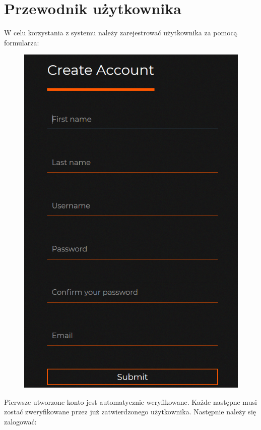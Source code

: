\documentclass[12pt] {article}
\begin{document}
\newpage
\section{Przewodnik użytkownika}
W celu korzystania z systemu należy zarejestrować użytkownika za pomocą formularza:
\begin{figure}[H]
\centering
\includegraphics[scale=0.4]{res/Rejestracja}
\end{figure}
Pierwsze utworzone konto jest automatycznie weryfikowane. Każde następne musi zostać zweryfikowane przez już zatwierdzonego użytkownika. \newpage
Następnie należy się zalogować:
\end{document}
